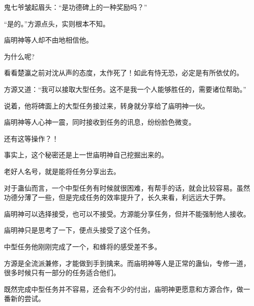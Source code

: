 \begin{this_body}
鬼七爷皱起眉头：“是功德碑上的一种奖励吗？”

“是的。”方源点头，实则根本不知。

庙明神等人却不由地相信他。

为什么呢?

看看楚瀛之前对沈从声的态度，太作死了！如此有恃无恐，必定是有所依仗的。

方源又道：“我可以接取大型任务。这不是我一个人能够胜任的，需要诸位帮助。”

说着，他将碑面上的大型任务接过来，转身就分享给了庙明神一伙。

庙明神等人心神一震，同时接收到任务的讯息，纷纷脸色微变。

还有这等操作？！

事实上，这个秘密还是上一世庙明神自己挖掘出来的。

老好人名号，就是能将任务分享出去。

对于蛊仙而言，一个中型任务有时候就很困难，有帮手的话，就会比较容易。虽然功德分薄了一些，但是完成任务的效率提升了，长久来看，利远远大于弊。

庙明神可以选择接受，也可以不接受。方源能分享任务，但并不能强制他人接收。

庙明神只是思考了一下，便点头接受了这个任务。

中型任务他刚刚完成了一个，和蜂将的感受差不多。

方源是全流派兼修，才能做到手到擒来。而庙明神等人是正常的蛊仙，专修一道，很多时候只有一部分的任务适合他们。

既然完成中型任务并不容易，还会有不少的付出，庙明神更愿意和方源合作，做一番新的尝试。

\end{this_body}

